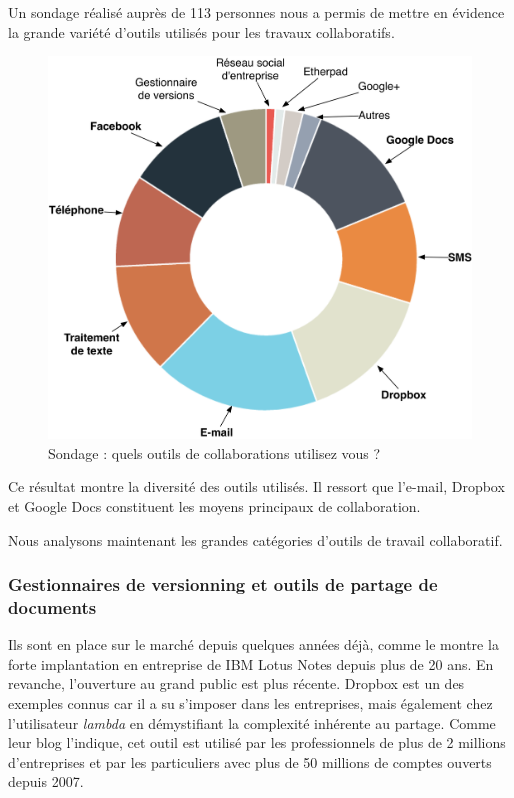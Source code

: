 \documentclass[10pt,twocolumn,a4paper,utf8x]{article}
\begin{document}
Un sondage réalisé auprès de 113 personnes nous a permis de mettre en
évidence la grande variété d'outils utilisés pour les travaux
collaboratifs.

\begin{figure}[htbp]
\centering
\includegraphics[width=\hsize]{sondageOutils.png}
\caption{Sondage : quels outils de collaborations utilisez vous ?}
\end{figure}

Ce résultat montre la diversité des outils utilisés. Il ressort que
l'e-mail, Dropbox et Google Docs constituent les moyens principaux de
collaboration.

Nous analysons maintenant les grandes catégories d'outils de travail
collaboratif.

\subsubsection{Gestionnaires de versionning et outils de partage de
documents}

Ils sont en place sur le marché depuis quelques années déjà, comme le
montre la forte implantation en entreprise de IBM Lotus Notes depuis
plus de 20 ans. En revanche, l'ouverture au grand public est plus
récente. Dropbox est un des exemples connus car il a su s'imposer dans
les entreprises, mais également chez l'utilisateur \emph{lambda} en
démystifiant la complexité inhérente au partage. Comme leur blog
l'indique, cet outil est utilisé par les professionnels de plus de 2
millions d'entreprises et par les particuliers avec plus de 50 millions
de comptes ouverts depuis 2007.
\end{document}
